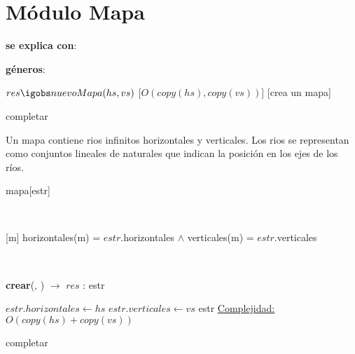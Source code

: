 \documentclass[10pt, a4paper]{article}
\newcommand{\completar}{{\color{orange}completar}}
\begin{document}
\section{Módulo Mapa}

\begin{Interfaz}
  
  \textbf{se explica con}: 

  \textbf{géneros}: 


  {$res \igobs nuevoMapa(hs, vs)$}%
    [$O(copy(hs), copy(vs))$]
  [crea un mapa]

    \completar

\end{Interfaz}

\begin{Representacion}
  

  Un mapa contiene rios infinitos horizontales y verticales. Los rios se
  representan como conjuntos lineales de naturales que indican la posición en
  los ejes de los ríos.

  \begin{Estructura}{mapa}[estr]
    \begin{Tupla}[estr]
    \end{Tupla}

  \end{Estructura}
  

    ~ 

  [m]{
      horizontales(m) = $estr$.horizontales $\land$ 
      verticales(m) = $estr$.verticales
  }

\end{Representacion}

~

\begin{Algoritmos}

\begin{algorithm}[H]{\textbf{crear}(, ) $\to$ $res$ : estr}
\begin{algorithmic}[1]
    \State $estr.horizontales \gets hs$
    \State $estr.verticales \gets vs$
    \State \Return estr
    \medskip
    \Statex \underline{Complejidad:} $O(copy(hs) + copy(vs))$
\end{algorithmic}
\end{algorithm}

\completar
  
\end{Algoritmos}
\end{document}
